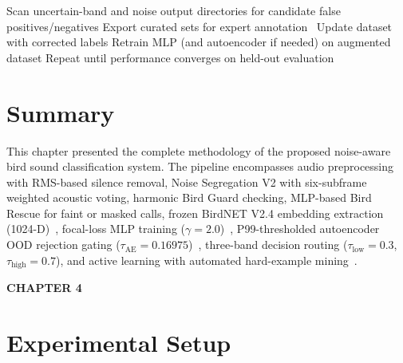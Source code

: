 \documentclass[a4paper,12pt]{article}
\begin{document}
\vspace{0.4cm}

\begin{algorithm}[H]
\caption{Active Learning and Hard-Example Mining}
\begin{algorithmic}[1]
\STATE Scan uncertain-band and noise output directories for candidate false positives/negatives
\STATE Export curated sets for expert annotation~\cite{Kath,Rauch}
\STATE Update dataset with corrected labels
\STATE Retrain MLP (and autoencoder if needed) on augmented dataset
\STATE Repeat until performance converges on held-out evaluation
\end{algorithmic}
\end{algorithm}

\section{Summary}

\noindent
This chapter presented the complete methodology of the proposed noise-aware bird sound
classification system. The pipeline encompasses audio preprocessing with RMS-based silence
removal, Noise Segregation V2 with six-subframe weighted acoustic voting, harmonic Bird Guard
checking, MLP-based Bird Rescue for faint or masked calls, frozen BirdNET V2.4 embedding
extraction (1024-D)~\cite{BirdNET}, focal-loss MLP training ($\gamma = 2.0$)~\cite{FocalLoss},
P99-thresholded autoencoder OOD rejection gating ($\tau_{\mathrm{AE}} = 0.16975$)~\cite{Ntalampiras,Hinton},
three-band decision routing ($\tau_{\mathrm{low}} = 0.3$, $\tau_{\mathrm{high}} = 0.7$), and
active learning with automated hard-example mining~\cite{Kath,Rauch}.

\newpage
\thispagestyle{plain}

\begin{center}
{\fontsize{18}{20}\bfseries CHAPTER 4}
\end{center}


\vspace{0.5cm}

\setcounter{section}{0}
\renewcommand{\thesection}{4.\arabic{section}}

\section{Experimental Setup}
\end{document}
